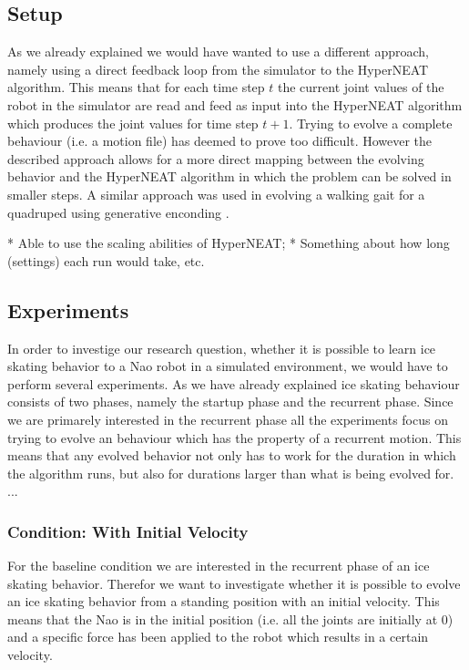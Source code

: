 \documentclass[a4paper,10pt]{article}
\begin{document}
\subsection{Setup}
As we already explained we would have wanted to use a different approach, namely using a direct feedback loop from the simulator to the HyperNEAT algorithm. This means that for each time step $t$ the current joint values of the robot in the simulator are read and feed as input into the HyperNEAT algorithm which produces the joint values for time step $t + 1$. Trying to evolve a complete behaviour (i.e. a motion file) has deemed to prove too difficult. However the described approach allows for a more direct mapping between the evolving behavior and the HyperNEAT algorithm in which the problem can be solved in smaller steps. A similar approach was used in evolving a walking gait for a quadruped using generative enconding \cite{EvolvingCoordinatedQuadrupedQaitsWithTheHyperNEATGenerativeEncoding}.

* Able to use the scaling abilities of HyperNEAT;
* Something about how long (settings) each run would take, etc.

\subsection{Experiments}
In order to investige our research question, whether it is possible to learn ice skating behavior to a Nao robot in a simulated environment, we would have to perform several experiments. As we have already explained ice skating behaviour consists of two phases, namely the startup phase and the recurrent phase. Since we are primarely interested in the recurrent phase all the experiments focus on trying to evolve an behaviour which has the property of a recurrent motion. This means that any evolved behavior not only has to work for the duration in which the algorithm runs, but also for durations larger than what is being evolved for. ...


\subsubsection{Condition: With Initial Velocity}
For the baseline condition we are interested in the recurrent phase of an ice skating behavior. Therefor we want to investigate whether it is possible to evolve an ice skating behavior from a standing position with an initial velocity. This means that the Nao is in the initial position (i.e. all the joints are initially at 0) and a specific force has been applied to the robot which results in a certain velocity. 
\end{document}
